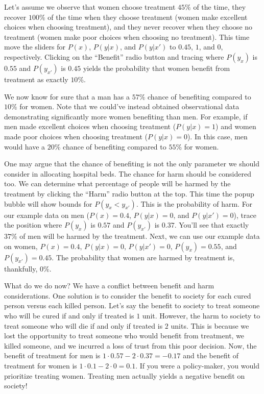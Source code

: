 \documentclass{article}
\begin{document}
Let's assume we observe that women choose treatment $45\%$ of the time, they recover $100\%$ of the time when they choose treatment (women make excellent choices when choosing treatment), and they never recover when they choose no treatment (women make poor choices when choosing no treatment). This time move the sliders for $P(x)$, $P(y|x)$, and $P(y|x')$ to $0.45$, $1$, and $0$, respectively. Clicking on the ``Benefit'' radio button and tracing where $P(y_x)$ is $0.55$ and $P(y_{x'})$ is $0.45$ yields the probability that women benefit from treatment as exactly $10\%$.

We now know for sure that a man has a $57\%$ chance of benefiting compared to $10\%$ for women. Note that we could've instead obtained observational data demonstrating significantly more women benefiting than men. For example, if men made excellent choices when choosing treatment ($P(y|x) = 1$) and women made poor choices when choosing treatment ($P(y|x) = 0$). In this case, men would have a $20\%$ chance of benefiting compared to $55\%$ for women.

One may argue that the chance of benefiting is not the only parameter we should consider in allocating hospital beds. The chance for harm should be considered too. We can determine what percentage of people will be harmed by the treatment by clicking the ``Harm'' radio button at the top. This time the popup bubble will show bounds for $P(y_x < y_{x'})$. This is the probability of harm. For our example data on men ($P(x) = 0.4$, $P(y|x) = 0$, and $P(y|x') = 0$), trace the position where $P(y_x)$ is $0.57$ and $P(y_{x'})$ is $0.37$. You'll see that exactly $37\%$ of men will be harmed by the treatment. Next, we can use our example data on women, $P(x) = 0.4$, $P(y|x) = 0$, $P(y|x') = 0$, $P(y_x) = 0.55$, and $P(y_{x'}) = 0.45$. The probability that women are harmed by treatment is, thankfully, $0\%$.

What do we do now? We have a conflict between benefit and harm considerations. One solution is to consider the benefit to society for each cured person versus each killed person. Let's say the benefit to society to treat someone who will be cured if and only if treated is $1$ unit. However, the harm to society to treat someone who will die if and only if treated is $2$ units. This is because we lost the opportunity to treat someone who would benefit from treatment, we killed someone, and we incurred a loss of trust from this poor decision. Now, the benefit of treatment for men is $1 \cdot 0.57 - 2 \cdot 0.37 = -0.17$ and the benefit of treatment for women is $1 \cdot 0.1 - 2 \cdot 0 = 0.1$. If you were a policy-maker, you would prioritize treating women. Treating men actually yields a negative benefit on society!
\end{document}
